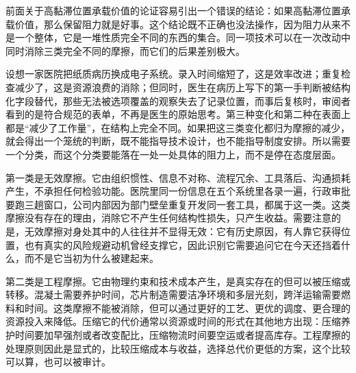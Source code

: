 
前面关于高黏滞位置承载价值的论证容易引出一个错误的结论：如果高黏滞位置承载价值，那么保留阻力就是好事。这个结论既不正确也没法操作，因为阻力从来不是一个整体，它是一堆性质完全不同的东西的集合。同一项技术可以在一次改动中同时消除三类完全不同的摩擦，而它们的后果差别极大。

设想一家医院把纸质病历换成电子系统。录入时间缩短了，这是效率改进；重复检查减少了，这是资源浪费的消除；但同时，医生在病历上写下的第一手判断被结构化字段替代，那些无法被选项覆盖的观察失去了记录位置，而事后复核时，审阅者看到的是符合规范的表单，不再是医生的原始思考。第三种变化和第二种在表面上都是“减少了工作量”，在结构上完全不同。如果把这三类变化都归为摩擦的减少，就会得出一个笼统的判断，既不能指导技术设计，也不能指导制度安排。所以需要一个分类，而这个分类要能落在一处一处具体的阻力上，而不是停在态度层面。


第一类是无效摩擦。它由组织惯性、信息不对称、流程冗余、工具落后、沟通损耗产生，不承担任何检验功能。医院里同一份信息在五个系统里各录一遍，行政审批要跑三趟窗口，公司内部因为部门壁垒重复开发同一套工具，都属于这一类。这类摩擦没有存在的理由，消除它不产生任何结构性损失，只产生收益。需要注意的是，无效摩擦对身处其中的人往往并不显得无效：它有历史原因，有人靠它获得位置，也有真实的风险规避动机曾经支撑它，因此识别它需要追问它在今天还挡着什么，而不是它当初为什么被建起来。

第二类是工程摩擦。它由物理约束和技术成本产生，是真实存在的但可以被压缩或转移。混凝土需要养护时间，芯片制造需要洁净环境和多层光刻，跨洋运输需要燃料和时间。这类摩擦不能被消除，但可以通过更好的工艺、更优的调度、更合理的资源投入来降低。压缩它的代价通常以资源或时间的形式在其他地方出现：压缩养护时间要加早强剂或者改变配比，压缩物流时间要空运或者提高库存。工程摩擦的处理原则因此是显式的，比较压缩成本与收益，选择总代价更低的方案，这个比较可以算，也可以被审计。

